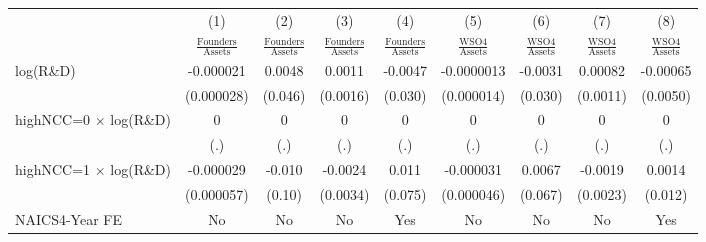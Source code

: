 {
\def\sym#1{\ifmmode^{#1}\else\(^{#1}\)\fi}
\begin{tabular}{l*{8}{c}}
\toprule
                    &\multicolumn{1}{c}{(1)}&\multicolumn{1}{c}{(2)}&\multicolumn{1}{c}{(3)}&\multicolumn{1}{c}{(4)}&\multicolumn{1}{c}{(5)}&\multicolumn{1}{c}{(6)}&\multicolumn{1}{c}{(7)}&\multicolumn{1}{c}{(8)}\\
                    &\multicolumn{1}{c}{$\frac{\textrm{Founders}}{\textrm{Assets}}$}&\multicolumn{1}{c}{$\frac{\textrm{Founders}}{\textrm{Assets}}$}&\multicolumn{1}{c}{$\frac{\textrm{Founders}}{\textrm{Assets}}$}&\multicolumn{1}{c}{$\frac{\textrm{Founders}}{\textrm{Assets}}$}&\multicolumn{1}{c}{$\frac{\textrm{WSO4}}{\textrm{Assets}}$}&\multicolumn{1}{c}{$\frac{\textrm{WSO4}}{\textrm{Assets}}$}&\multicolumn{1}{c}{$\frac{\textrm{WSO4}}{\textrm{Assets}}$}&\multicolumn{1}{c}{$\frac{\textrm{WSO4}}{\textrm{Assets}}$}\\
\midrule
log(R\&D)           &   -0.000021         &      0.0048         &      0.0011         &     -0.0047         &  -0.0000013         &     -0.0031         &     0.00082         &    -0.00065         \\
                    &  (0.000028)         &     (0.046)         &    (0.0016)         &     (0.030)         &  (0.000014)         &     (0.030)         &    (0.0011)         &    (0.0050)         \\
\addlinespace
highNCC=0 $\times$ log(R\&D)&           0         &           0         &           0         &           0         &           0         &           0         &           0         &           0         \\
                    &         (.)         &         (.)         &         (.)         &         (.)         &         (.)         &         (.)         &         (.)         &         (.)         \\
\addlinespace
highNCC=1 $\times$ log(R\&D)&   -0.000029         &      -0.010         &     -0.0024         &       0.011         &   -0.000031         &      0.0067         &     -0.0019         &      0.0014         \\
                    &  (0.000057)         &      (0.10)         &    (0.0034)         &     (0.075)         &  (0.000046)         &     (0.067)         &    (0.0023)         &     (0.012)         \\
\addlinespace
NAICS4-Year FE      &          No         &          No         &          No         &         Yes         &          No         &          No         &          No         &         Yes         \\

\end{tabular}}
